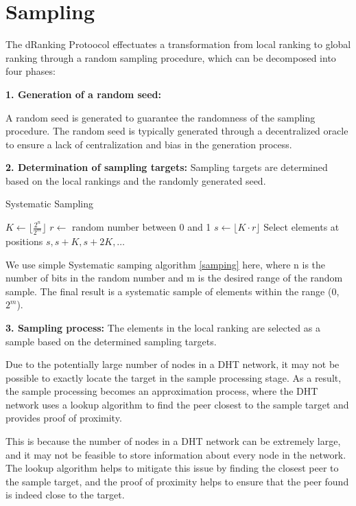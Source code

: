 \documentclass[twocolumn]{article}
\begin{document}
\section{Sampling}

The dRanking Protoocol effectuates a transformation from local ranking to global ranking through a random sampling procedure, which can be decomposed into four phases:

\textbf{1. Generation of a random seed:}

A random seed is generated to guarantee the randomness of the sampling procedure. The random seed is typically generated through a decentralized oracle to ensure a lack of centralization and bias in the generation process.

\textbf{2. Determination of sampling targets:} Sampling targets are determined based on the local rankings and the randomly generated seed.

\begin{algorithm}[htbp]
  \caption{Systematic Sampling}
  \label{samping}
\begin{algorithmic}[1]
\State $K \gets \lfloor \frac{2^n}{2^m} \rfloor$
\State $r \gets$ random number between 0 and 1
\State $s \gets \lfloor K \cdot r \rfloor$
\State Select elements at positions $s, s + K, s + 2K, \dots$
\end{algorithmic}
\end{algorithm}


We use simple Systematic samping algorithm \ref{samping} here, where n is the number of bits in the random number and m is the desired range of the random sample. The final result is a systematic sample of elements within the range (0, $2^m$).

\textbf{3. Sampling process:} The elements in the local ranking are selected as a sample based on the determined sampling targets.

Due to the potentially large number of nodes in a DHT\cite{Chord} network, it may not be possible to exactly locate the target in the sample processing stage. As a result, the sample processing becomes an approximation process, where the DHT network uses a lookup algorithm to find the peer closest to the sample target and provides proof of proximity.

This is because the number of nodes in a DHT network can be extremely large, and it may not be feasible to store information about every node in the network. The lookup algorithm helps to mitigate this issue by finding the closest peer to the sample target, and the proof of proximity helps to ensure that the peer found is indeed close to the target.
\end{document}
